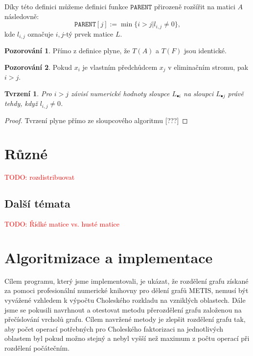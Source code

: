 \documentclass[11pt,american,czech,oneside]{book}
\theoremstyle{plain}
\newtheorem{proposition}{Tvrzení}
\theoremstyle{definition}
\newtheorem{observation}{Pozorování}
\newcommand{\TODO}[1]{\textcolor{red}{TODO: #1}}
\begin{document}
Díky této definici můžeme definici funkce $\texttt{PARENT}$ přirozeně rozšířit na matici $A$ následovně:
\[
    \texttt{PARENT}[j] := \min \{i > j | l_{i,j} \neq 0\},
\]
kde $l_{i,j}$ označuje $i,j$-tý prvek matice $L$.

\begin{observation}
Přímo z definice plyne, že $T(A)$ a $T(F)$ jsou identické.
\end{observation}

\begin{observation}
Pokud $x_i$ je vlastním předchůdcem $x_j$ v eliminačním stromu, pak $i > j$.
\end{observation}

\begin{proposition}
  Pro $i>j$ závisí numerické hodnoty sloupce $L_{\bullet i}$ na sloupci $L_{\bullet j}$ právě tehdy,
  když $l_{i,j} \neq 0$.
\end{proposition}
\begin{proof}
  Tvrzení plyne přímo ze sloupcového algoritmu [???]
\end{proof}



\chapter{Různé}
\TODO{rozdistribuovat}
\section{Další témata}
\TODO{Řídké matice vs. husté matice}


\chapter{Algoritmizace a implementace}

Cílem programu, který jsme implementovali, je ukázat, že rozdělení grafu získané za pomoci profesionální numerické knihovny pro dělení grafů METIS, nemusí být vyvážené vzhledem k výpočtu Choleského rozkladu na vzniklých oblastech. Dále jsme se pokusili navrhnout a otestovat metodu přerozdělení grafu založenou na přečíslování vrcholů grafu. Cílem navržené metody je zlepšit rozdělení grafu tak, aby počet operací potřebných pro Choleského faktorizaci na jednotlivých oblastem byl pokud možno stejný a nebyl vyšší než maximum z počtu operací při rozdělení počátečním.
\end{document}
